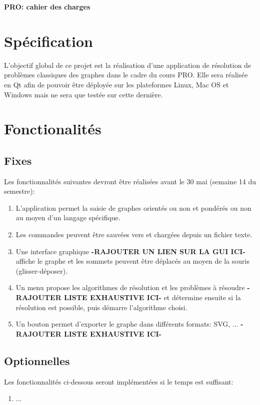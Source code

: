 \documentclass[french]{article}
\begin{document}
	\centering
	\large{\textbf{PRO: cahier des charges}}
	
	\justify
	
	\section{Spécification}
		L'objectif global de ce projet est la réalisation d'une application de résolution de problèmes classiques des graphes dans le cadre du cours PRO. Elle sera réalisée en Qt afin de pouvoir être déployée sur les plateformes Linux, Mac OS et Windows mais ne sera que testée sur cette dernière.
	\section{Fonctionalités}
		\subsection{Fixes}
			Les fonctionnalités suivantes devront être réalisées avant le 30 mai (semaine 14 du semestre):
			\begin{enumerate}
				\item L'application permet la saisie de graphes orientés ou non et pondérés ou non au moyen d'un langage spécifique.
				\item Les commandes peuvent être sauvées vers et chargées depuis un fichier texte.
				\item Une interface graphique \textbf{-RAJOUTER UN LIEN SUR LA GUI ICI-} affiche le graphe et les sommets peuvent être déplacés au moyen de la souris (glisser-déposer).
				\item Un menu propose les algorithmes de résolution et les problèmes à résoudre \textbf{-RAJOUTER LISTE EXHAUSTIVE ICI-} et détermine ensuite si la résolution est possible, puis démarre l'algorithme choisi.
				\item Un bouton permet d'exporter le graphe dans différents formats: SVG, ... \textbf{-RAJOUTER LISTE EXHAUSTIVE ICI-}
			\end{enumerate}
		\subsection{Optionnelles}
			Les fonctionnalités ci-dessous seront implémentées si le temps est suffisant:
			\begin{enumerate}
				\item ...
			\end{enumerate}	
	
			
\end{document}
